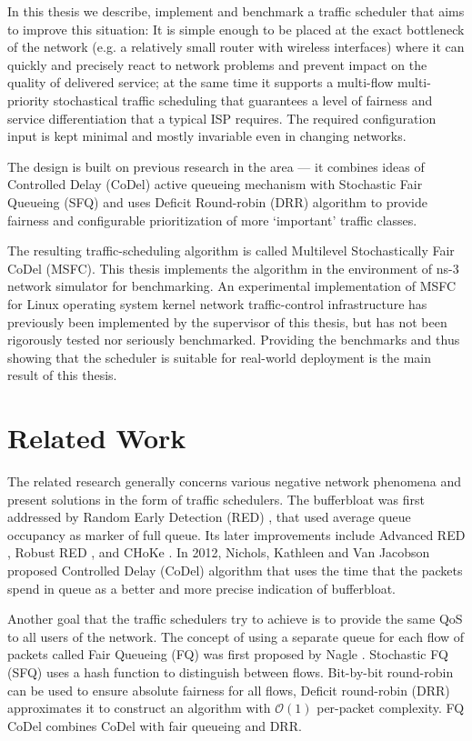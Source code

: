 In this thesis we describe, implement and benchmark a traffic scheduler that aims to improve this situation: It is simple enough to be placed at the exact bottleneck of the network (e.g. a relatively small router with wireless interfaces) where it can quickly and precisely react to network problems and prevent impact on the quality of delivered service; at the same time it supports a multi-flow multi-priority stochastical traffic scheduling that guarantees a level of fairness and service differentiation that a typical ISP requires. The required configuration input is kept minimal and mostly invariable even in changing networks.

The design is built on previous research in the area --- it combines ideas of Controlled Delay (CoDel) \cite{CoDel} active queueing mechanism with Stochastic Fair Queueing (SFQ) \cite{SFQ} and uses Deficit Round-robin (DRR) \cite{EffDRR} algorithm to provide fairness and configurable prioritization of more `important' traffic classes.

The resulting traffic-scheduling algorithm is called Multilevel Stochastically Fair CoDel (MSFC). This thesis implements the algorithm in the environment of ns-3 network simulator \cite{ns3} for benchmarking. An experimental implementation of MSFC for Linux operating system kernel network traffic-control infrastructure has previously been implemented by the supervisor of this thesis, but has not been rigorously tested nor seriously benchmarked. Providing the benchmarks and thus showing that the scheduler is suitable for real-world deployment is the main result of this thesis.


\section*{Related Work}
The related research generally concerns various negative network phenomena and present solutions in the form of traffic schedulers. The bufferbloat was first addressed by Random Early Detection (RED) \cite{Floyd:1993:RED:169931.169935}, that used average queue occupancy as marker of full queue. Its later improvements include Advanced RED \cite{Floyd01adaptivered:}, Robust RED \cite{RRED}, and CHoKe \cite{pan2000choke}. In 2012, Nichols, Kathleen and Van Jacobson proposed Controlled Delay (CoDel) algorithm that uses the time that the packets spend in queue as a better and more precise indication of bufferbloat.

Another goal that the traffic schedulers try to achieve is to provide the same QoS to all users of the network. The concept of using a separate queue for each flow of packets called Fair Queueing (FQ) was first proposed by Nagle \cite{Nagle:FQ}. Stochastic FQ (SFQ) \cite{SFQ} uses a hash function to distinguish between flows. Bit-by-bit round-robin \cite{demers1989analysis} can be used to ensure absolute fairness for all flows, Deficit round-robin (DRR) \cite{EffDRR} approximates it to construct an algorithm with $\mathcal{O}(1)$ per-packet complexity. FQ CoDel \cite{fq_codel} combines CoDel with fair queueing and DRR.

